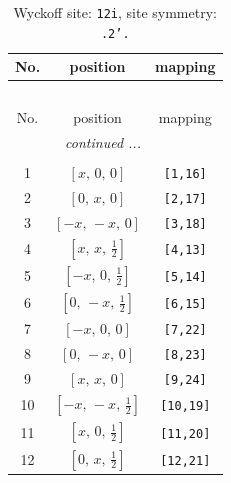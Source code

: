 \documentclass[fleqn,8pt]{jsarticle}
\begin{document}
\renewcommand{\arraystretch}{1.2}
\begin{longtable}{ccc}
\caption{Wyckoff site: {\tt 12i}, site symmetry: {\tt .2'.}}
 \\
 \hline \hline
No. & position & mapping \\ \hline \endfirsthead

\multicolumn{2}{l}{\tablename\ \thetable{}} \\
 \hline \hline
No. & position & mapping \\ \hline \endhead

 \hline \hline
\multicolumn{2}{r}{\footnotesize\it continued ...} \\ \endfoot

 \hline \hline
\multicolumn{2}{r}{} \\ \endlastfoot

1 & $\left[ x,\, 0,\, 0 \right]$ & {\tt [1,16]} \\ \hline
2 & $\left[ 0,\, x,\, 0 \right]$ & {\tt [2,17]} \\ \hline
3 & $\left[ - x,\, - x,\, 0 \right]$ & {\tt [3,18]} \\ \hline
4 & $\left[ x,\, x,\, \frac{1}{2} \right]$ & {\tt [4,13]} \\ \hline
5 & $\left[ - x,\, 0,\, \frac{1}{2} \right]$ & {\tt [5,14]} \\ \hline
6 & $\left[ 0,\, - x,\, \frac{1}{2} \right]$ & {\tt [6,15]} \\ \hline
7 & $\left[ - x,\, 0,\, 0 \right]$ & {\tt [7,22]} \\ \hline
8 & $\left[ 0,\, - x,\, 0 \right]$ & {\tt [8,23]} \\ \hline
9 & $\left[ x,\, x,\, 0 \right]$ & {\tt [9,24]} \\ \hline
10 & $\left[ - x,\, - x,\, \frac{1}{2} \right]$ & {\tt [10,19]} \\ \hline
11 & $\left[ x,\, 0,\, \frac{1}{2} \right]$ & {\tt [11,20]} \\ \hline
12 & $\left[ 0,\, x,\, \frac{1}{2} \right]$ & {\tt [12,21]} \\
\end{longtable}
\renewcommand{\arraystretch}{1.2}
\end{document}
